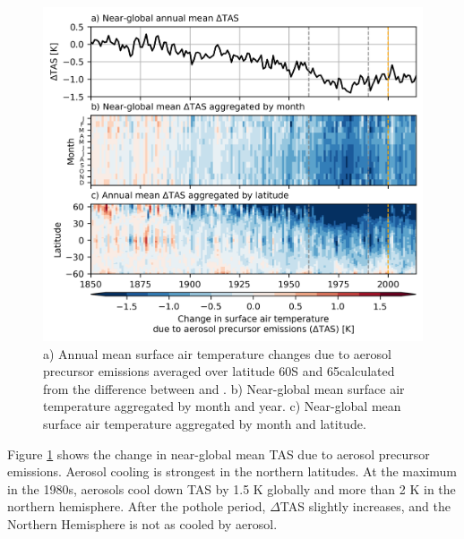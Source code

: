 \begin{figure}
    \centering
    \includegraphics{Chapter4/Figs/tas_change_aerosols.png}
    \caption[Surface air temperature changes due to aerosol precursor emissions]{a) Annual mean surface air temperature changes due to aerosol precursor emissions averaged over latitude 60\textdegree S and 65\textdegree calculated from the difference between \hist{} and \histpiaer{}. b) Near-global mean surface air temperature aggregated by month and year. c) Near-global mean surface air temperature aggregated by month and latitude.}
    \label{fig:ch4:tas-change-aerosol}
\end{figure}

Figure \ref{fig:ch4:tas-change-aerosol} shows the change in near-global mean TAS due to aerosol precursor emissions. Aerosol cooling is strongest in the northern latitudes. At the maximum in the 1980s, aerosols cool down TAS by 1.5 K globally and more than 2 K in the northern hemisphere. After the pothole period, $\Delta$TAS slightly increases, and the Northern Hemisphere is not as cooled by aerosol. 


